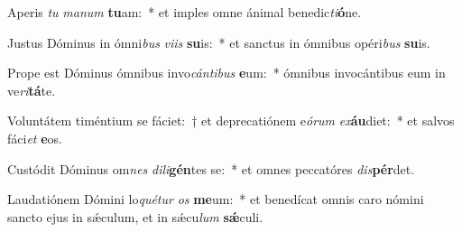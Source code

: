 \item Aperis \textit{tu} \textit{ma}\textit{num} \textbf{tu}am:~* et imples omne ánimal benedic\textit{ti}\textbf{ó}ne.
\item Justus Dóminus in ómni\textit{bus} \textit{vi}\textit{is} \textbf{su}is:~* et sanctus in ómnibus opéri\textit{bus} \textbf{su}is.
\item Prope est Dóminus ómnibus invo\textit{cán}\textit{ti}\textit{bus} \textbf{e}um:~* ómnibus invocántibus eum in ve\textit{ri}\textbf{tá}te.
\item Voluntátem timéntium se fáciet:~† et deprecatiónem e\textit{ó}\textit{rum} \textit{ex}\textbf{áu}diet:~* et salvos fáci\textit{et} \textbf{e}os.
\item Custódit Dóminus om\textit{nes} \textit{di}\textit{li}\textbf{gén}tes se:~* et omnes peccatóres \textit{dis}\textbf{pér}det.
\item Laudatiónem Dómini lo\textit{qué}\textit{tur} \textit{os} \textbf{me}um:~* et benedícat omnis caro nómini sancto ejus in sǽculum, et in sǽcu\textit{lum} \textbf{sǽ}culi.
